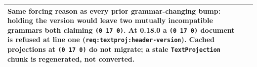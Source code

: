 \documentclass[11pt,letterpaper]{report}
\begin{document}
\begin{longtable}{p{2cm} p{2.5cm} p{9cm}}
  Same forcing reason as every prior grammar-changing bump: holding the version
  would leave two mutually incompatible grammars both claiming
  \texttt{(0 17 0)}. At 0.18.0 a \texttt{(0 17 0)} document is refused at line
  one (\texttt{req:textproj:header-version}). Cached projections at
  \texttt{(0 17 0)} do not migrate; a stale \texttt{TextProjection} chunk is
  regenerated, not converted. \\
\bottomrule
\end{longtable}
\end{document}
